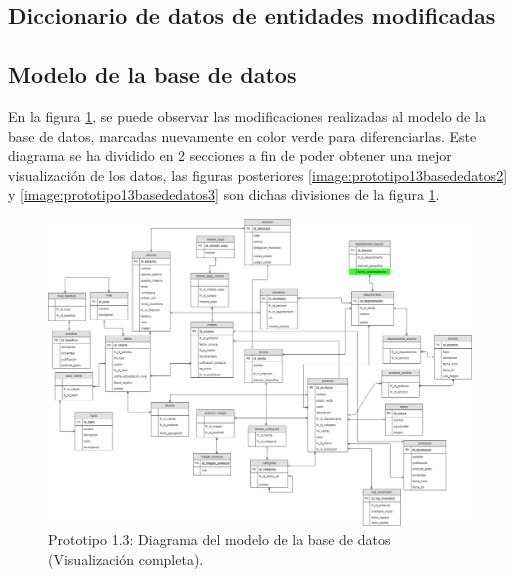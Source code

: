 \subsection{Diccionario de datos de entidades modificadas}


\subsection{Modelo de la base de datos}
En la figura \ref{image:prototipo13basededatos1}, se puede observar las modificaciones realizadas al modelo de la base de datos, marcadas nuevamente en color verde para diferenciarlas. Este diagrama se ha dividido en 2 secciones a fin de poder obtener una mejor visualización de los datos, las figuras posteriores \ref{image:prototipo13basededatos2} y \ref{image:prototipo13basededatos3} son dichas divisiones de la figura \ref{image:prototipo13basededatos1}.
\label{Modelo-BD}
\FloatBarrier
\begin{figure}[htbp!]
		\centering
			\includegraphics[width=.9 \textwidth]{imagenes/modeloDatos/prototipo13/TT_Database_1}
		\caption{Prototipo 1.3: Diagrama del modelo de la base de datos (Visualización completa).}
		\label{image:prototipo13basededatos1}
\end{figure}
\FloatBarrier

